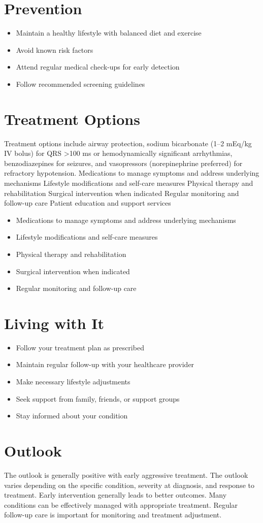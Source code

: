 \section{Prevention}
\begin{itemize}[noitemsep]
  \item Maintain a healthy lifestyle with balanced diet and exercise
  \item Avoid known risk factors
  \item Attend regular medical check-ups for early detection
  \item Follow recommended screening guidelines
\end{itemize}
\section{Treatment Options}
Treatment options include airway protection, sodium bicarbonate (1--2 mEq/kg IV bolus) for QRS >100 ms or hemodynamically significant arrhythmias, benzodiazepines for seizures, and vasopressors (norepinephrine preferred) for refractory hypotension. Medications to manage symptoms and address underlying mechanisms Lifestyle modifications and self-care measures Physical therapy and rehabilitation Surgical intervention when indicated Regular monitoring and follow-up care Patient education and support services

\begin{itemize}[noitemsep]
  \item Medications to manage symptoms and address underlying mechanisms
  \item Lifestyle modifications and self-care measures
  \item Physical therapy and rehabilitation
  \item Surgical intervention when indicated
  \item Regular monitoring and follow-up care
\end{itemize}
\section{Living with It}
\begin{itemize}[noitemsep]
  \item Follow your treatment plan as prescribed
  \item Maintain regular follow-up with your healthcare provider
  \item Make necessary lifestyle adjustments
  \item Seek support from family, friends, or support groups
  \item Stay informed about your condition
\end{itemize}
\section{Outlook}
The outlook is generally positive with early aggressive treatment. The outlook varies depending on the specific condition, severity at diagnosis, and response to treatment. Early intervention generally leads to better outcomes. Many conditions can be effectively managed with appropriate treatment. Regular follow-up care is important for monitoring and treatment adjustment.
